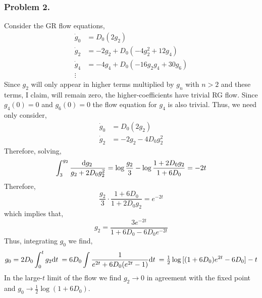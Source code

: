 \documentclass[12pt]{article}
\begin{document}
\subsubsection{Problem 2.}

Consider the GR flow equations,
\begin{align*}
\dot{g}_0 & = D_0 (2 g_2)
\\
\dot{g}_2 & = -2 g_2 + D_0(-4 g_2^2 + 12 g_4)
\\
\dot{g}_4 & = -4 g_4 + D_0(-16 g_2 g_4 + 30 g_6)
\\
\vdots
\end{align*}
Since $g_2$ will only appear in higher terms multiplied by $g_n$ with $n > 2$ and these terms, I claim, will remain zero, the higher-coefficients  have trivial RG flow. Since $g_4(0) = 0$ and $g_6(0) = 0$ the flow equation for $g_4$ is also trivial. Thus, we need only consider,
\begin{align*}
\dot{g}_0 & = D_0 (2 g_2)
\\
\dot{g}_2 & = -2 g_2 - 4 D_0 g_2^2 
\end{align*}
Therefore, solving,
\begin{align*}
\int_{3}^{g_2} \frac{\mathrm{d}g_2 \:}{g_2 + 2 D_0 g_2^2} = \log{\frac{g_2}{3}} - \log{\frac{1 + 2 D_0 g_2}{1 + 6 D_0}} = - 2 t
\end{align*}
Therefore,
\[ \frac{g_2}{3} \cdot \frac{1 + 6 D_0}{1 + 2 D_0 g_2} = e^{-2 t} \]
which implies that,
\[ g_2 = \frac{3 e^{-2 t}}{1 + 6 D_0 - 6 D_0 e^{-2 t}} \]
Thus, integrating $g_0$ we find,
\[ g_0 = 2 D_0 \int_0^t g_2 \mathrm{d}t \: = 6 D_0 \int \frac{1}{e^{2t} + 6 D_0 (e^{2t} - 1)} \mathrm{d}t \: = \tfrac{1}{2} \log{[(1 + 6 D_0) e^{2 t} - 6 D_0]} - t \]
In the large-$t$ limit of the flow we find $g_2 \to 0$ in agreement with the fixed point and $g_0 \to \tfrac{1}{2} \log{(1 + 6 D_0)}$. 
\end{document}
